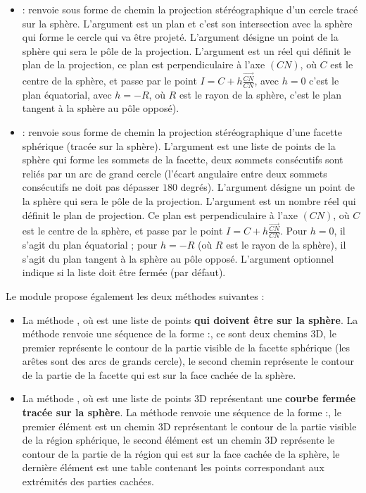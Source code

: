 \begin{itemize}
    \item {} : renvoie sous forme de chemin la projection stéréographique d'un cercle tracé sur la sphère. L'argument  est un plan et c'est son intersection avec la sphère qui forme le cercle qui va être projeté. L'argument  désigne un point de la sphère qui sera le pôle de la projection. L'argument  est un réel qui définit le plan de la projection, ce plan est perpendiculaire à l'axe $(CN)$, où $C$ est le centre de la sphère, et passe par le point $I=C+h \frac{\vec{CN}}{CN}$, avec $h=0$ c'est le plan équatorial, avec $h=-R$, où $R$ est le rayon de la sphère, c'est le plan tangent à la sphère au pôle opposé).
    
    \item {} : renvoie sous forme de chemin la projection stéréographique d'une facette sphérique (tracée sur la sphère). L'argument  est une liste de points de la sphère qui forme les sommets de la facette, deux sommets consécutifs sont reliés par un arc de grand cercle (l'écart angulaire entre deux sommets consécutifs ne doit pas dépasser $180$ degrés). L'argument  désigne un point de la sphère qui sera le pôle de la projection. L'argument  est un nombre réel qui définit le plan de projection. Ce plan est perpendiculaire à l'axe $(CN)$, où $C$ est le centre de la sphère, et passe par le point $I=C+h \frac{\vec{CN}}{CN}$. Pour $h=0$, il s'agit du plan équatorial ; pour $h=-R$ (où $R$ est le rayon de la sphère), il s'agit du plan tangent à la sphère au pôle opposé. L'argument optionnel  indique si la liste  doit être fermée (\true par défaut).
\end{itemize}

Le module propose également les deux méthodes suivantes :

\begin{itemize}
    \item La méthode , où  est une liste de points \textbf{qui doivent être sur la sphère}. La méthode renvoie une séquence de la forme :, ce sont deux chemins 3D, le premier représente le contour de la partie visible de la facette sphérique (les arêtes sont des arcs de grands cercle), le second chemin représente le contour de la partie de la facette qui est sur la face cachée de la sphère.
    
    \item La méthode , où  est une liste de points 3D représentant une \textbf{courbe fermée tracée sur la sphère}. La méthode renvoie une séquence de la forme :, le premier élément est un chemin 3D représentant le contour de la partie visible de la région sphérique, le second élément est un chemin 3D représente le contour de la partie de la région qui est sur la face cachée de la sphère, le dernière élément est une table contenant les points correspondant aux extrémités des parties cachées.
\end{itemize}

